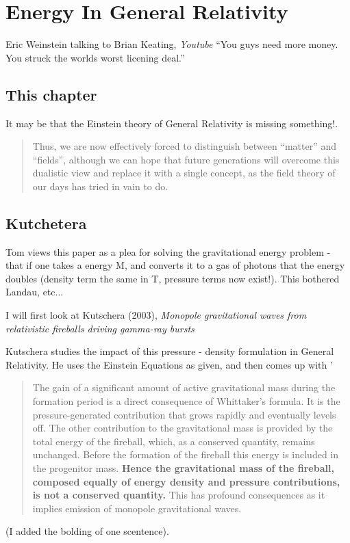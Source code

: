 \documentclass[../rzero]{subfiles}
\begin{document}
\chapter{Energy In General Relativity}\label{energyGeneralRelativityChapter}

\begin{chapquote}{Eric Weinstein talking to Brian Keating, \textit{Youtube\cite{drbriankeatingEricWeinsteinTheoretical2020}}}
``You guys need more money. You struck the worlds worst licening deal.''
\end{chapquote}


\section{This chapter}
It may be that the Einstein theory of General Relativity is missing something!\cite{08092323EnergyMomentumGravitational}. 

\begin{quotation}
	Thus, we are now effectively forced to distinguish between “matter” and “fields”, although we can hope that future generations will overcome this dualistic view and replace it with a single concept, as the field theory of our days has tried in vain to do. 
\end{quotation}

\section{Kutchetera}
Tom views this paper as a plea for solving the gravitational energy problem - that if one takes a energy M, and converts it to a gas of photons that the energy doubles (density term the same in T, pressure terms now exist!). This bothered Landau, etc... 

 

I will first look at Kutschera (2003)\cite{Kutschera2003}, \textit{Monopole gravitational waves from relativistic fireballs driving gamma-ray bursts}

Kutschera studies the impact of this pressure - density formulation in General Relativity. He uses the Einstein Equations as given, and then comes up with '
\begin{quotation}
		The gain of a significant amount of active gravitational mass during the formation period is a direct consequence of Whittaker’s formula. It is the pressure-generated contribution that grows rapidly and eventually levels off. The other contribution to the gravitational mass is provided by the total energy of the fireball, which, as a conserved quantity, remains unchanged. Before the formation of the fireball this energy is included in the progenitor mass. \textbf{Hence the gravitational mass of the fireball, composed equally of energy density and pressure contributions, is not a conserved quantity.} This has profound consequences as it implies emission of monopole gravitational waves.
\end{quotation} (I added the bolding of one scentence).
\end{document}
